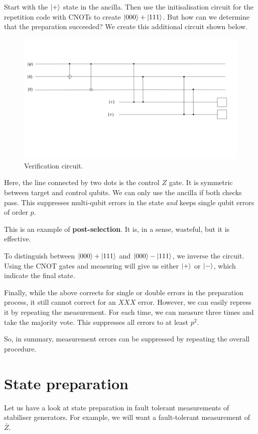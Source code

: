 Start with the $\ket{+}$ state in the ancilla. Then use the initisalisation circuit for the repetition code with CNOTs to create $\ket{000} + \ket{111}$. But how can we determine that the preparation succeeded? We create this additional circuit shown below. 

\begin{figure}[h]
\centering
\includegraphics[width = \textwidth]{./Verification_Circuit.jpg}
\caption{Verification circuit.}
\end{figure}

Here, the line connected by two dots is the control $Z$ gate. It is symmetric between target and control qubits. We can only use the ancilla if both checks pass. This suppresses multi-qubit errors in the state \emph{and} keeps single qubit errors of order $p$. 

This is an example of \textbf{post-selection}. It is, in a sense, wasteful, but it is effective. 

To distinguish between $\ket{000} + \ket{111}$ and $\ket{000} - \ket{111}$, we inverse the circuit. Using the CNOT gates and measuring will give us either $\ket{+}$ or $\ket{-}$, which indicate the final state. 

Finally, while the above corrects for single or double errors in the preparation process, it still cannot correct for an $XXX$ error. However, we can easily repress it by repeating the measurement. For each time, we can measure three times and take the majority vote. This suppresses all errors to at least $p^2$. 

So, in summary, measurement errors can be suppressed by repeating the overall procedure. 

\section{State preparation}
Let us have a look at state preparation in fault tolerant measurements of stabiliser generators. For example, we will want a fault-tolerant measurement of $\bar{Z}$. 

